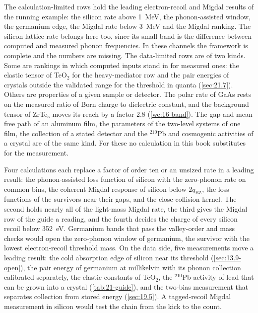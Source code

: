 The calculation-limited rows hold the leading electron-recoil and Migdal results of the running example: the silicon rate above \SI{1}{MeV}, the phonon-assisted window, the germanium edge, the Migdal rate below \SI{3}{MeV} and the Migdal ranking. The silicon lattice rate belongs here too, since its small band is the difference between computed and measured phonon frequencies. In these channels the framework is complete and the numbers are missing. The data-limited rows are of two kinds. Some are rankings in which computed inputs stand in for measured ones: the elastic tensor of TeO$_2$ for the heavy-mediator row and the pair energies of crystals outside the validated range for the threshold in quanta (\cref{sec:21.7}). Others are properties of a given sample or detector. The polar rate of GaAs rests on the measured ratio of Born charge to dielectric constant, and the background tensor of ZrTe$_5$ moves its reach by a factor 2.8 (\cref{we:16-band}). The gap and mean free path of an aluminum film, the parameters of the two-level systems of one film, the collection of a stated detector and the $^{210}$Pb and cosmogenic activities of a crystal are of the same kind. For these no calculation in this book substitutes for the measurement.

Four calculations each replace a factor of order ten or an unsized rate in a leading result: the phonon-assisted loss function of silicon with the zero-phonon rate on common bins, the coherent Migdal response of silicon below $2q_{\mathrm{BZ}}$, the loss functions of the survivors near their gaps, and the close-collision kernel. The second holds nearly all of the light-mass Migdal rate, the third gives the Migdal row of the guide a reading, and the fourth decides the charge of every silicon recoil below \SI{352}{eV}. Germanium bands that pass the valley-order and mass checks would open the zero-phonon window of germanium, the survivor with the lowest electron-recoil threshold mass. On the data side, five measurements move a leading result: the cold absorption edge of silicon near its threshold (\cref{sec:13.9-open}), the pair energy of germanium at millikelvin with its phonon collection calibrated separately, the elastic constants of TeO$_2$, the $^{210}$Pb activity of lead that can be grown into a crystal (\cref{tab:21-guide}), and the two-bias measurement that separates collection from stored energy (\cref{sec:19.5}). A tagged-recoil Migdal measurement in silicon would test the chain from the kick to the count.
